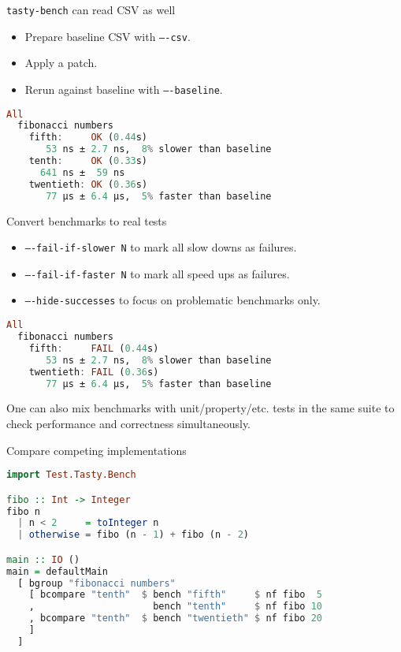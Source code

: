 \documentclass[handout]{beamer}
\begin{document}
\begin{frame}[fragile]{{\tt tasty-bench} can read CSV as well}

\pause

\begin{itemize}[<+->]
\item Prepare baseline CSV with {\tt ----csv}.
\item Apply a patch.
\item Rerun against baseline with {\tt ----baseline}.
\end{itemize}

\pause\bigskip

\begin{lstlisting}[language=Haskell]
All
  fibonacci numbers
    fifth:     OK (0.44s)
       53 ns ± 2.7 ns,  8% slower than baseline
    tenth:     OK (0.33s)
      641 ns ±  59 ns
    twentieth: OK (0.36s)
       77 μs ± 6.4 μs,  5% faster than baseline
\end{lstlisting}


\end{frame}

\begin{frame}[fragile]{Convert benchmarks to real tests}

\begin{itemize}[<+->]
\item {\tt ----fail-if-slower N} to mark all slow downs as failures.
\item {\tt ----fail-if-faster N} to mark all speed ups as failures.
\item {\tt ----hide-successes} to focus on problematic benchmarks only.
\end{itemize}

\pause\bigskip

\begin{lstlisting}[language=Haskell]
All
  fibonacci numbers
    fifth:     FAIL (0.44s)
       53 ns ± 2.7 ns,  8% slower than baseline
    twentieth: FAIL (0.36s)
       77 μs ± 6.4 μs,  5% faster than baseline
\end{lstlisting}

\pause\bigskip

One can also mix benchmarks with unit/property/etc. tests
in the same suite to check performance and correctness simultaneously.

\end{frame}

\begin{frame}[fragile]{Compare competing implementations}

\begin{lstlisting}[language=Haskell]
import Test.Tasty.Bench

fibo :: Int -> Integer
fibo n
  | n < 2     = toInteger n
  | otherwise = fibo (n - 1) + fibo (n - 2)

main :: IO ()
main = defaultMain
  [ bgroup "fibonacci numbers"
    [ bcompare "tenth"  $ bench "fifth"     $ nf fibo  5
    ,                     bench "tenth"     $ nf fibo 10
    , bcompare "tenth"  $ bench "twentieth" $ nf fibo 20
    ]
  ]
\end{lstlisting}

\end{frame}
\end{document}
